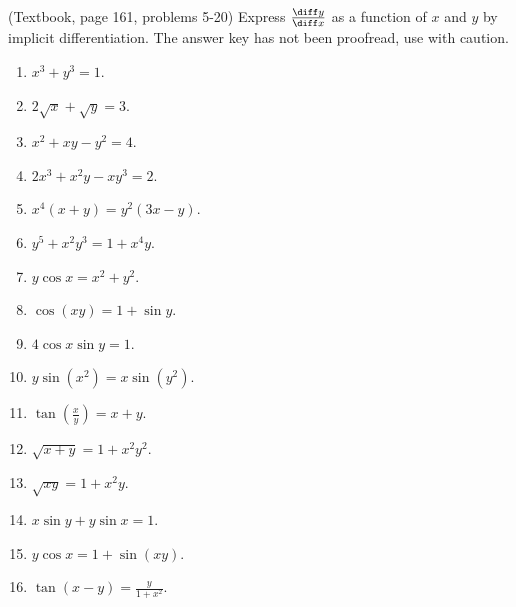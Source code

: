 (Textbook, page 161, problems 5-20) Express $\frac{\diff y}{\diff x}$ as a function of $x$ and $y$ by implicit differentiation. The answer key has not been proofread, use with caution.
\begin{multicols}{3}
\begin{enumerate}
\item $x^3+y^3=1$.
\item $ 2\sqrt x+\sqrt y=3$.
\item $ x^2+x y-y^2=4$.
\item $ 2x^3+x^2y-x y^3=2$.
\item $ x^4(x+y)=y^2(3x-y)$.
\item $ y^5+x^2y^3=1+x^4y $.
\item $ y\cos x=x^2+y^2 $.
\item $ \cos (x y)=1+\sin y$.
\item $ 4\cos x\sin y=1$.
\item $ y\sin (x^2)=x\sin (y^2)$.
\item $ \tan \left(\frac{x}{y}\right)=x+y$.
\item $ \sqrt{x+y}=1+x^2y^2$.
\item $ \sqrt{xy}=1+x^2 y$.
\item $ x\sin y+y\sin x=1$.
\item $ y\cos x=1+\sin (x y)$.
\item $ \tan (x-y)=\frac{y}{1+x^2}$.
\end{enumerate}
\end{multicols}